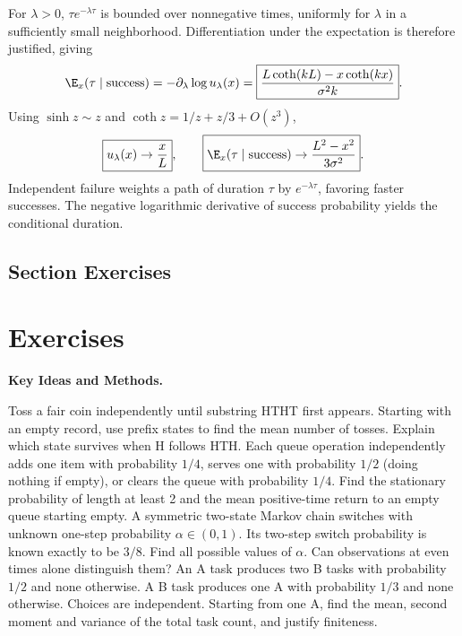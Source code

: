 For $\lambda>0$, $\tau e^{-\lambda\tau}$ is bounded over nonnegative times, uniformly for $\lambda$ in a sufficiently small neighborhood. Differentiation under the expectation is therefore justified, giving
\[
 \E_x(\tau\mid\text{success})=-\partial_\lambda\log u_\lambda(x)
 =\boxed{\frac{L\coth(kL)-x\coth(kx)}{\sigma^2k}}.
\]
Using $\sinh z\sim z$ and $\coth z=1/z+z/3+O(z^3)$,
\[
 \boxed{u_\lambda(x)\to\frac xL},\qquad
 \boxed{\E_x(\tau\mid\text{success})\to\frac{L^2-x^2}{3\sigma^2}}.
\]
\insight Independent failure weights a path of duration $\tau$ by $e^{-\lambda\tau}$, favoring faster successes. The negative logarithmic derivative of success probability yields the conditional duration.



\par{}
\subsection*{Section Exercises}



\section{Exercises}
\noindent\textbf{Key Ideas and Methods.}\enspace



Toss a fair coin independently until substring HTHT first appears. Starting with an empty record, use prefix states to find the mean number of tosses. Explain which state survives when H follows HTH.
Each queue operation independently adds one item with probability $1/4$, serves one with probability $1/2$ (doing nothing if empty), or clears the queue with probability $1/4$. Find the stationary probability of length at least 2 and the mean positive-time return to an empty queue starting empty.
A symmetric two-state Markov chain switches with unknown one-step probability $\alpha\in(0,1)$. Its two-step switch probability is known exactly to be $3/8$. Find all possible values of $\alpha$. Can observations at even times alone distinguish them?
An A task produces two B tasks with probability $1/2$ and none otherwise. A B task produces one A with probability $1/3$ and none otherwise. Choices are independent. Starting from one A, find the mean, second moment and variance of the total task count, and justify finiteness.

